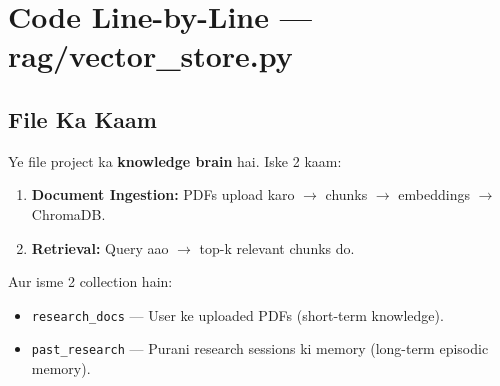 \documentclass[11pt, a4paper]{article}
\begin{document}
\section{Code Line-by-Line --- rag/vector\_store.py}

\subsection{File Ka Kaam}

\begin{storybox}
Ye file project ka \textbf{knowledge brain} hai. Iske 2 kaam:
\begin{enumerate}[label=\textcolor{accentpurple}{\arabic*.}]
\item \textbf{Document Ingestion:} PDFs upload karo $\rightarrow$ chunks $\rightarrow$ embeddings $\rightarrow$ ChromaDB.
\item \textbf{Retrieval:} Query aao $\rightarrow$ top-k relevant chunks do.
\end{enumerate}

Aur isme 2 collection hain:
\begin{itemize}
\item \texttt{research\_docs} --- User ke uploaded PDFs (short-term knowledge).
\item \texttt{past\_research} --- Purani research sessions ki memory (long-term episodic memory).
\end{itemize}
\end{storybox}
\end{document}

